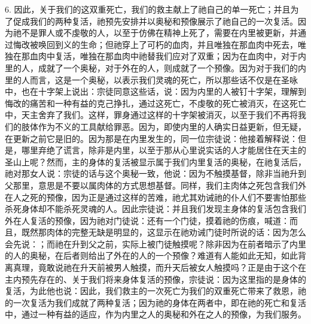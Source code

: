 6. 因此，关于我们的这双重死亡，我们的救主献上了祂自己的单一死亡；并且为了促成我们的两种复活，祂预先安排并以奥秘和预像展示了祂自己的一次复活。因为祂不是罪人或不虔敬的人，以至于仿佛在精神上死了，需要在内里被更新，并通过悔改被唤回到义的生命；但祂穿上了可朽的血肉，并且唯独在那血肉中死去，唯独在那血肉中复活，唯独在那血肉中祂替我们应对了双重；因为在血肉中，对于内里的人，成就了一个奥秘，对于外在的人，则成就了一个预像。因为对于我们的内里的人而言，这是一个奥秘，以表示我们灵魂的死亡，所以那些话不仅是在圣咏中，也在十字架上说出：宗徒同意这些话，说：因为内里的人被钉十字架，理解到悔改的痛苦和一种有益的克己挣扎，通过这死亡，不虔敬的死亡被消灭，在这死亡中，天主舍弃了我们。这样，罪身通过这样的十字架被消灭，以至于我们不再将我们的肢体作为不义的工具献给罪恶。因为，即使内里的人确实日益更新，但无疑，在更新之前它是旧的。因为那是在内里发生的，同一位宗徒说：他接着解释说：但是，哪里弃绝了谎言，除非是内里，以至于那从心里说实话的人才能居住在天主的圣山上呢？然而，主的身体的复活被显示属于我们内里复活的奥秘，在祂复活后，祂对那女人说：宗徒的话与这个奥秘一致，他说：因为不触摸基督，除非当祂升到父那里，意思是不要以属肉体的方式思想基督。同样，我们主肉体之死包含我们外在人之死的预像，因为正是通过这样的苦难，祂尤其劝诫祂的仆人们不要害怕那些杀死身体却不能杀死灵魂的人。因此宗徒说：并且我们发现主身体的复活包含我们外在人复活的预像，因为祂对门徒说：还有一个门徒，摸着祂的伤痕，喊道：而且，既然那肉体的完整无缺是明显的，这显示在祂劝诫门徒时所说的话：因为怎么会先说：；而祂在升到父之前，实际上被门徒触摸呢？除非因为在前者暗示了内里的人的奥秘，在后者则给出了外在的人的一个预像？难道有人能如此无知，如此背离真理，竟敢说祂在升天前被男人触摸，而升天后被女人触摸吗？正是由于这个在主内预先存在的、关于我们将来身体复活的预像，宗徒说：因为这里指的是身体的复活，为此他也说：因此，我们救主的一次死亡为我们的双重死亡带来了救恩，祂的一次复活为我们成就了两种复活；因为祂的身体在两者中，即在祂的死亡和复活中，通过一种有益的适应，作为内里之人的奥秘和外在之人的预像，为我们服务。\par

